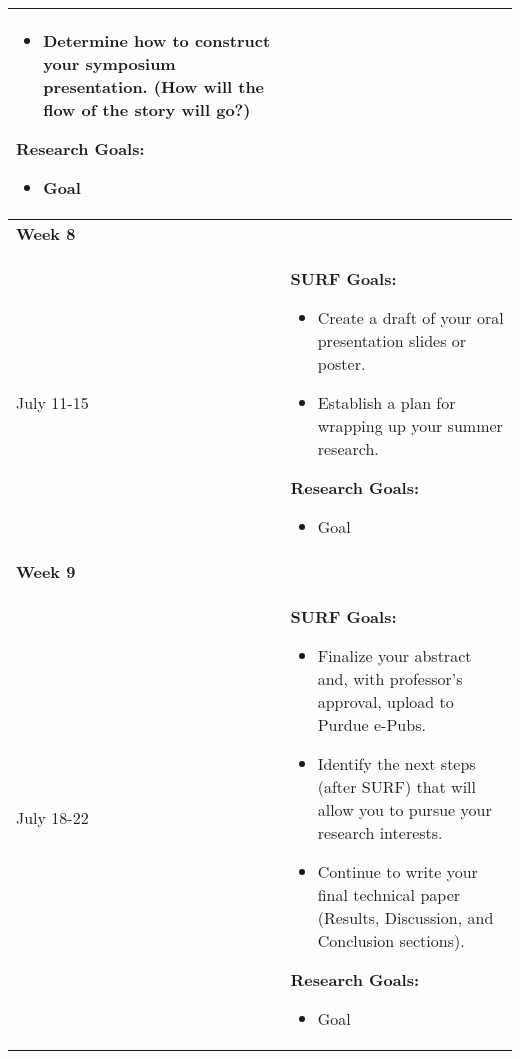 \documentclass[a4paper]{journal}
\begin{document}
\begin{longtable}{| m{} | p{}|}
\begin{itemize}
                                      \item Determine how to construct your symposium presentation. (How will the flow of the story will go?)
                                    \end{itemize}
                                    \textbf{Research Goals:}
                                    \begin{itemize}
                                      \item Goal
                                    \end{itemize}\\
  \hline
  \textbf{Week 8} & \\ July 11-15 &  \textbf{SURF Goals:}
                                    \begin{itemize}
                                      \item Create a draft of your oral presentation slides or poster.
                                      \item Establish a plan for wrapping up your summer research.
                                    \end{itemize}
                                    \textbf{Research Goals:}
                                    \begin{itemize}
                                      \item Goal
                                    \end{itemize}\\
  \hline
  \textbf{Week 9} & \\ July 18-22 &  \textbf{SURF Goals:}
                                    \begin{itemize}
                                      \item Finalize your abstract and, with professor’s approval, upload to Purdue e-Pubs.
                                      \item Identify the next steps (after SURF) that will allow you to pursue your research interests.
                                      \item Continue to write your final technical paper (Results, Discussion, and Conclusion sections).
                                    \end{itemize}
                                    \textbf{Research Goals:}
                                    \begin{itemize}
                                      \item Goal

\end{itemize}
\end{longtable}
\end{document}
